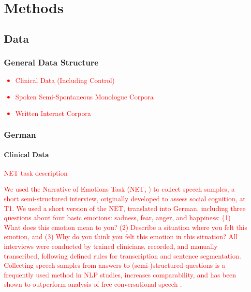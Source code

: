 
\chapter{Methods} %

\label{chap:3:methods} %


\section{Data}
\label{sec:methods:data}


\subsection{General Data Structure}
\label{sec:methods:data:structure}

\textcolor{red}{
\begin{itemize}
    \item Clinical Data (Including Control)
    \item Spoken Semi-Spontaneous Monologue Corpora
    \item Written Internet Corpora
\end{itemize}
}


\subsection{German}
\label{sec:methods:data:german}

\subsubsection{Clinical Data}

\textcolor{red}{NET task description}
\textcolor{red}{\cite{just2023validation}}

\textcolor{red}{We used the Narrative of Emotions Task (NET, \cite{buck2014net}) to collect speech samples, a short semi-structured interview, originally developed to assess social cognition, at T1. We used a short version of the NET, translated into German, including three questions about four basic emotions: sadness, fear, anger, and happiness: (1) What does this emotion mean to you? (2) Describe a situation where you felt this emotion, and (3) Why do you think you felt this emotion in this situation? All interviews were conducted by trained clinicians, recorded, and manually transcribed, following defined rules for transcription and sentence segmentation. Collecting speech samples from answers to (semi-)structured questions is a frequently used method in NLP studies, increases comparability, and has been shown to outperform analysis of free conversational speech \citep{morgan2021natural}.}

